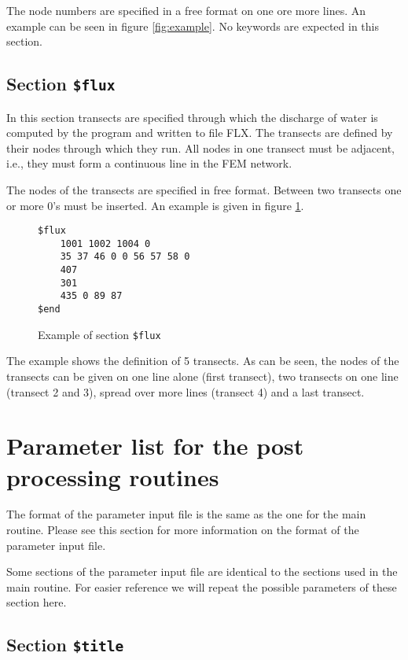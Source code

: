 \documentclass{report}
\begin{document}
The node numbers are specified in a free format on one ore more lines.
An example can be seen in figure \ref{fig:example}. No keywords
are expected in this section.


\subsection{Section {\tt \$flux}}

In this section transects are specified through which the discharge
of water is computed by the program and written to file FLX.
The transects are defined by their nodes through which they run.
All nodes in one transect must be adjacent, i.e., they must form a
continuous line in the FEM network.

The nodes of the transects are specified in free format. Between
two transects one or more 0's must be inserted. An example is given in
figure \ref{fig:fluxexample}.

\begin{figure}[ht]
\begin{verbatim}
$flux
	1001 1002 1004 0
	35 37 46 0 0 56 57 58 0
	407
	301
	435 0 89 87
$end
\end{verbatim}
\caption{Example of section {\tt \$flux}}
\label{fig:fluxexample}
\end{figure}

The example shows the definition of 5 transects. As can be seen, the 
nodes of the transects can be given on one line alone (first transect),
two transects on one line (transect 2 and 3), spread over more lines
(transect 4) and a last transect.



\section{Parameter list for the post processing routines}

The format of the parameter input file is the same as the one for
the main routine. Please see this section for more information
on the format of the parameter input file.

Some sections of the parameter input file are identical to the 
sections used in the main routine. For easier reference we will
repeat the possible parameters of these section here.






\subsection{Section {\tt \$title}}
\end{document}

